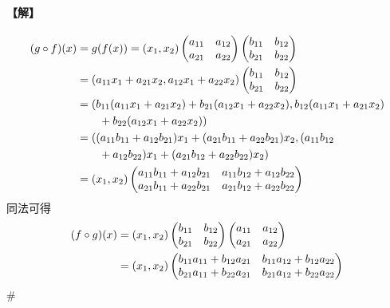 \paragraph{【解】}
\begin{align}
(g \circ f)(x) &= g(f(x)) = (x_1, x_2) \begin{pmatrix} a_{11} & a_{12} \\ a_{21} & a_{22} \end{pmatrix} \begin{pmatrix} b_{11} & b_{12} \\ b_{21} & b_{22} \end{pmatrix} \notag \\
&= (a_{11}x_1 + a_{21}x_2, a_{12}x_1 + a_{22}x_2) \begin{pmatrix} b_{11} & b_{12} \\ b_{21} & b_{22} \end{pmatrix} \notag \\
&= (b_{11}(a_{11}x_1 + a_{21}x_2) + b_{21}(a_{12}x_1 + a_{22}x_2), b_{12}(a_{11}x_1 + a_{21}x_2) \notag \\
&\qquad + b_{22}(a_{12}x_1 + a_{22}x_2)) \label{eq:b6s-1-7-1} \\
&= ((a_{11}b_{11} + a_{12}b_{21})x_1 + (a_{21}b_{11} + a_{22}b_{21})x_2, (a_{11}b_{12} \notag \\
&\qquad + a_{12}b_{22})x_1 + (a_{21}b_{12} + a_{22}b_{22})x_2) \label{eq:b6s-1-7-2} \\
&= (x_1, x_2) \begin{pmatrix}
a_{11}b_{11} + a_{12}b_{21} & a_{11}b_{12} + a_{12}b_{22} \\
a_{21}b_{11} + a_{22}b_{21} & a_{21}b_{12} + a_{22}b_{22}
\end{pmatrix} \label{eq:b6s-1-7-3}
\end{align}
同法可得
\begin{align}
(f \circ g)(x) &= (x_1, x_2) \begin{pmatrix} b_{11} & b_{12} \\ b_{21} & b_{22} \end{pmatrix} \begin{pmatrix} a_{11} & a_{12} \\ a_{21} & a_{22} \end{pmatrix} \notag \\
&= (x_1, x_2) \begin{pmatrix}
b_{11}a_{11} + b_{12}a_{21} & b_{11}a_{12} + b_{12}a_{22} \\
b_{21}a_{11} + b_{22}a_{21} & b_{21}a_{12} + b_{22}a_{22}
\end{pmatrix} \label{eq:b6s-1-7-4}
\end{align}
\hfill$\#$


